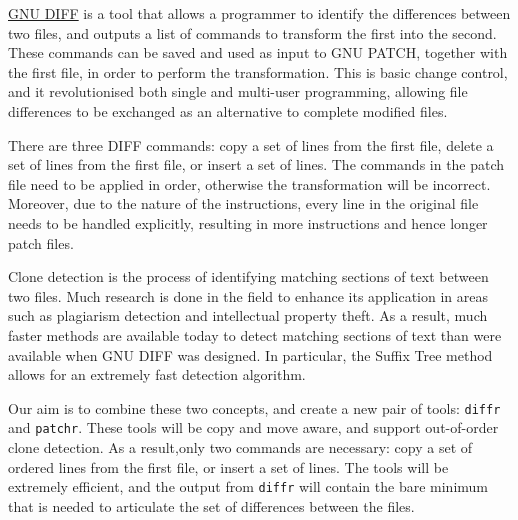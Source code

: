 \href{http://www.gnu.org/software/diffutils/}{GNU DIFF} is a tool that allows a programmer to identify the differences between two files, and outputs a list of commands to transform the first into the second.
These commands can be saved and used as input to GNU PATCH, together with the first file, in order to perform the transformation.
This is basic change control, and it revolutionised both single and multi-user programming, allowing file differences to be exchanged as an alternative to complete modified files.

There are three DIFF commands: copy a set of lines from the first file, delete a set of lines from the first file, or insert a set of lines.
The commands in the patch file need to be applied in order, otherwise the transformation will be incorrect. Moreover, due to the  nature of the instructions, every line in the original file needs to be handled explicitly, resulting in more instructions and hence longer patch files.

Clone detection is the process of identifying matching sections of text between two files.
Much research is done in the field to enhance its application in areas such as plagiarism detection and intellectual property theft.
As a result, much faster methods are available today to detect matching sections of text than were available when GNU DIFF was designed.
In particular, the Suffix Tree method allows for an extremely fast detection algorithm.

Our aim is to combine these two concepts, and create a new pair of tools: \texttt{diffr} and \texttt{patchr}.
These tools will be copy and move aware, and support out-of-order clone detection.
As a result,only two commands are necessary: copy a set of ordered lines from the first file, or insert a set of lines.
The tools will be extremely efficient, and the output from \texttt{diffr} will contain the bare minimum that is needed to articulate the set of differences between the files.
